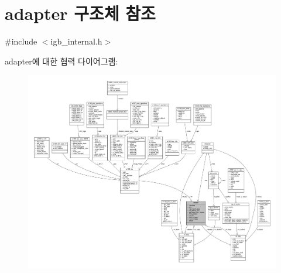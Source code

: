 \hypertarget{structadapter}{}\section{adapter 구조체 참조}
\label{structadapter}


{\ttfamily \#include $<$igb\+\_\+internal.\+h$>$}



adapter에 대한 협력 다이어그램\+:
\nopagebreak
\begin{figure}[H]
\begin{center}
\leavevmode
\includegraphics[width=350pt]{structadapter__coll__graph}
\end{center}
\end{figure}
